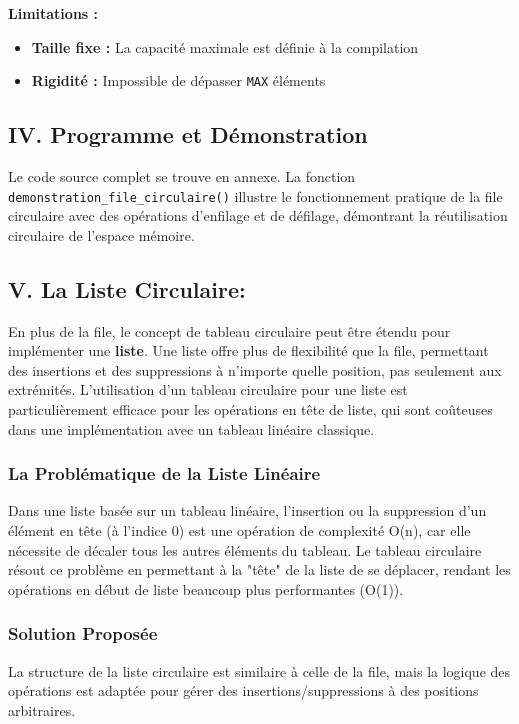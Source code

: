 \documentclass[a4paper, 11pt]{article}
\begin{document}
\textbf{Limitations :}
\begin{itemize}
    \item \textbf{Taille fixe :} La capacité maximale est définie à la compilation
    \item \textbf{Rigidité :} Impossible de dépasser \texttt{MAX} éléments
\end{itemize}

\subsection{IV. Programme et Démonstration}
Le code source complet se trouve en annexe. La fonction \texttt{demonstration\_file\_circulaire()} illustre le fonctionnement pratique de la file circulaire avec des opérations d'enfilage et de défilage, démontrant la réutilisation circulaire de l'espace mémoire.

\subsection{V. La Liste Circulaire:}

En plus de la file, le concept de tableau circulaire peut être étendu pour implémenter une \textbf{liste}. Une liste offre plus de flexibilité que la file, permettant des insertions et des suppressions à n'importe quelle position, pas seulement aux extrémités. L'utilisation d'un tableau circulaire pour une liste est particulièrement efficace pour les opérations en tête de liste, qui sont coûteuses dans une implémentation avec un tableau linéaire classique.

\subsubsection*{La Problématique de la Liste Linéaire}
Dans une liste basée sur un tableau linéaire, l'insertion ou la suppression d'un élément en tête (à l'indice 0) est une opération de complexité O(n), car elle nécessite de décaler tous les autres éléments du tableau. Le tableau circulaire résout ce problème en permettant à la "tête" de la liste de se déplacer, rendant les opérations en début de liste beaucoup plus performantes (O(1)).

\subsubsection*{Solution Proposée}
La structure de la liste circulaire est similaire à celle de la file, mais la logique des opérations est adaptée pour gérer des insertions/suppressions à des positions arbitraires.
\end{document}
